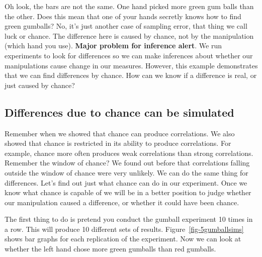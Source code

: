 \documentclass[
  letterpaper,
  DIV=11,
  numbers=noendperiod]{scrreprt}
\begin{document}
Oh look, the bars are not the same. One hand picked more green gum balls
than the other. Does this mean that one of your hands secretly knows how
to find green gumballs? No, it's just another case of sampling error,
that thing we call luck or chance. The difference here is caused by
chance, not by the manipulation (which hand you use). \textbf{Major
problem for inference alert}. We run experiments to look for differences
so we can make inferences about whether our manipulations cause change
in our measures. However, this example demonstrates that we can find
differences by chance. How can we know if a difference is real, or just
caused by chance?

\subsection{Differences due to chance can be
simulated}\label{differences-due-to-chance-can-be-simulated}

Remember when we showed that chance can produce correlations. We also
showed that chance is restricted in its ability to produce correlations.
For example, chance more often produces weak correlations than strong
correlations. Remember the window of chance? We found out before that
correlations falling outside the window of chance were very unlikely. We
can do the same thing for differences. Let's find out just what chance
can do in our experiment. Once we know what chance is capable of we will
be in a better position to judge whether our manipulation caused a
difference, or whether it could have been chance.

The first thing to do is pretend you conduct the gumball experiment 10
times in a row. This will produce 10 different sets of results.
Figure~\ref{fig-5gumballsims} shows bar graphs for each replication of
the experiment. Now we can look at whether the left hand chose more
green gumballs than red gumballs.
\end{document}
